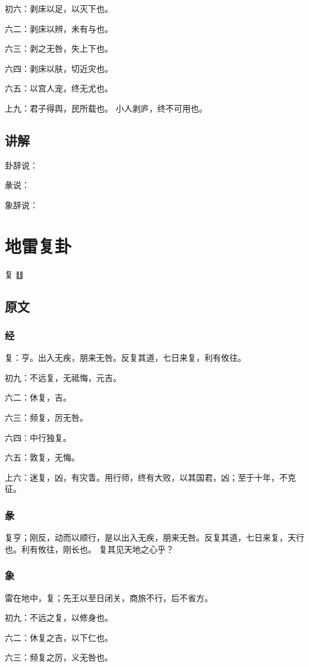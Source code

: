 \documentclass[12pt,oneside]{book}
\begin{document}
初六：剥床以足，以灭下也。

六二：剥床以辨，未有与也。

六三：剥之无咎，失上下也。

六四：剥床以肤，切近灾也。

六五：以宫人宠，终无尤也。

上九：君子得舆，民所载也。 小人剥庐，终不可用也。

\section{讲解}
卦辞说：

彖说：

象辞说：

\chapter{地雷复卦}
复 {\Large ䷗}

\section{原文}
\subsection{经}
复：亨。出入无疾，朋来无咎。反复其道，七日来复，利有攸往。

初九：不远复，无祗悔，元吉。

六二：休复，吉。

六三：频复，厉无咎。

六四：中行独复。

六五：敦复，无悔。

上六：迷复，凶，有灾眚。用行师，终有大败，以其国君，凶；至于十年，不克征。

\subsection{彖}
复亨；刚反，动而以顺行，是以出入无疾，朋来无咎。反复其道，七日来复，天行也。利有攸往，刚长也。 复其见天地之心乎？

\subsection{象}
雷在地中，复；先王以至日闭关，商旅不行，后不省方。

初九：不远之复，以修身也。

六二：休复之吉，以下仁也。

六三：频复之厉，义无咎也。
\end{document}
